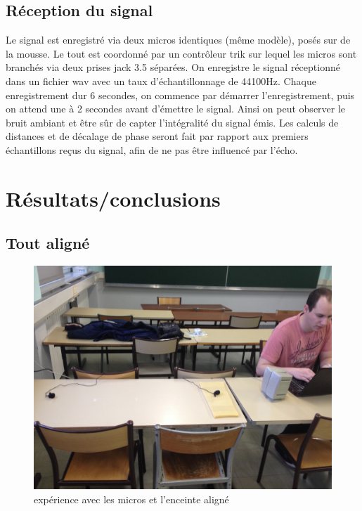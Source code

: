 \subsection{Réception du signal}
Le signal est enregistré via deux micros identiques (même modèle), posés sur de la mousse. Le tout est coordonné par un contrôleur trik sur lequel les micros sont branchés via deux prises jack 3.5 séparées.
On enregistre le signal réceptionné dans un fichier wav avec un taux d'échantillonnage de 44100Hz.
Chaque enregistrement dur 6 secondes, on commence par démarrer l'enregistrement, puis on attend une à 2 secondes avant d'émettre le signal. Ainsi on peut observer le bruit ambiant et être sûr de capter l'intégralité du signal émis.
Les calculs de distances et de décalage de phase seront fait par rapport aux premiers échantillons reçus du signal, afin de ne pas être influencé par l'écho.

\section{Résultats/conclusions}
\subsection{Tout aligné}
\begin{figure}[H]
\includegraphics[width=\textwidth]{../tests/test_du_protocole/micros_alignes.jpg} 
\caption{expérience avec les micros et l'enceinte aligné}
\end{figure}


